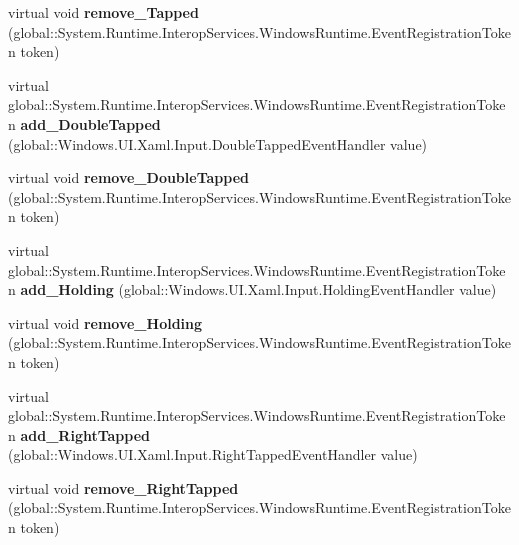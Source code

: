 \begin{DoxyCompactItemize}
virtual void {\bfseries remove\+\_\+\+Tapped} (global\+::\+System.\+Runtime.\+Interop\+Services.\+Windows\+Runtime.\+Event\+Registration\+Token token)
\item 
\mbox{\label{class_windows_1_1_u_i_1_1_xaml_1_1_u_i_element_a5dae62e559d69ce1b422ccd06618f671}} 
virtual global\+::\+System.\+Runtime.\+Interop\+Services.\+Windows\+Runtime.\+Event\+Registration\+Token {\bfseries add\+\_\+\+Double\+Tapped} (global\+::\+Windows.\+U\+I.\+Xaml.\+Input.\+Double\+Tapped\+Event\+Handler value)
\item 
\mbox{\label{class_windows_1_1_u_i_1_1_xaml_1_1_u_i_element_a943e8ea205e8d92b950867b58c4406d7}} 
virtual void {\bfseries remove\+\_\+\+Double\+Tapped} (global\+::\+System.\+Runtime.\+Interop\+Services.\+Windows\+Runtime.\+Event\+Registration\+Token token)
\item 
\mbox{\label{class_windows_1_1_u_i_1_1_xaml_1_1_u_i_element_a4bbe62d6b5ea9aa8d3c4d53f196cc796}} 
virtual global\+::\+System.\+Runtime.\+Interop\+Services.\+Windows\+Runtime.\+Event\+Registration\+Token {\bfseries add\+\_\+\+Holding} (global\+::\+Windows.\+U\+I.\+Xaml.\+Input.\+Holding\+Event\+Handler value)
\item 
\mbox{\label{class_windows_1_1_u_i_1_1_xaml_1_1_u_i_element_a1cb283d7dedbabf394dd0cd9a384d808}} 
virtual void {\bfseries remove\+\_\+\+Holding} (global\+::\+System.\+Runtime.\+Interop\+Services.\+Windows\+Runtime.\+Event\+Registration\+Token token)
\item 
\mbox{\label{class_windows_1_1_u_i_1_1_xaml_1_1_u_i_element_a2013f410a096b8dec9f149c57069520c}} 
virtual global\+::\+System.\+Runtime.\+Interop\+Services.\+Windows\+Runtime.\+Event\+Registration\+Token {\bfseries add\+\_\+\+Right\+Tapped} (global\+::\+Windows.\+U\+I.\+Xaml.\+Input.\+Right\+Tapped\+Event\+Handler value)
\item 
\mbox{\label{class_windows_1_1_u_i_1_1_xaml_1_1_u_i_element_a89eaa447c459a4c2b259272790db23ad}} 
virtual void {\bfseries remove\+\_\+\+Right\+Tapped} (global\+::\+System.\+Runtime.\+Interop\+Services.\+Windows\+Runtime.\+Event\+Registration\+Token token)

\end{DoxyCompactItemize}
